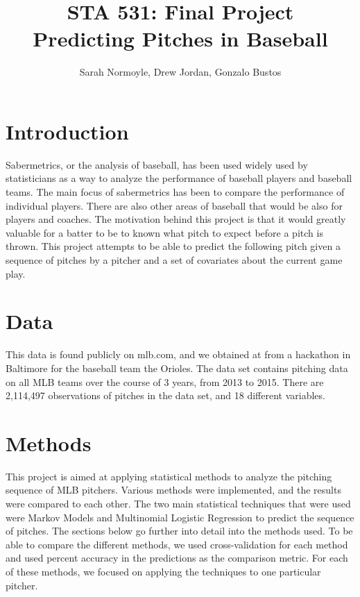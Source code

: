 \documentclass{article}
\begin{document}
\title{STA 531: Final Project \\ Predicting Pitches in Baseball}
\author{Sarah Normoyle, Drew Jordan, Gonzalo Bustos}

\maketitle 

\section{Introduction}

Sabermetrics, or the analysis of baseball, has been used widely used by statisticians as a way to analyze the performance of baseball players and baseball teams. The main focus of sabermetrics has been to compare the performance of individual players. There are also other areas of baseball that would be also for players and coaches. The motivation behind this project is that it would greatly valuable for a batter to be to known what pitch to expect before a pitch is thrown. This project attempts to be able to predict the following pitch given a sequence of pitches by a pitcher and a set of covariates about the current game play. 

\section{Data}

This data is found publicly on mlb.com, and we obtained at from a hackathon in Baltimore for the baseball team the Orioles. The data set contains pitching data on all MLB teams over the course of 3 years, from 2013 to 2015. There are 2,114,497 observations of pitches in the data set, and 18 different variables. 


\section{Methods}

This project is aimed at applying statistical methods to analyze the pitching sequence of MLB pitchers. Various methods were implemented, and the results were compared to each other. The two main statistical techniques that were used were Markov Models and Multinomial Logistic Regression to predict the sequence of pitches. The sections below go further into detail into the methods used. To be able to compare the different methods, we used cross-validation for each method and used percent accuracy in the predictions as the comparison metric. For each of these methods, we focused on applying the techniques to one particular pitcher.
\end{document}

